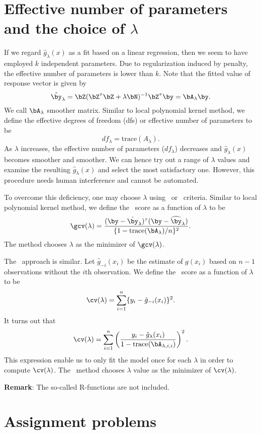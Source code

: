  
\section{Effective number of parameters and the choice of $\lambda$}
  
If we regard $\hat g_\lambda (x)$ as a fit based on
a linear regression, then we seem to have employed
$k$ independent parameters.
Due to regularization induced by penalty, the 
effective number of parameters is lower than $k$. 
Note that the fitted value of response vector is given by 
$$
\hat{\by}_{\lambda}
=\bZ (\bZ^\tau \bZ + \lambda \bN)^{-1}\bZ^\tau \by
=\bA_{\lambda} \by.
$$   
We call $\bA_{\lambda}$ smoother matrix.
Similar to local polynomial kernel method, we define
the effective degrees of  freedom (dfs) 
or effective number of parameters to be
$$
df_{\lambda} =\mbox{trace}(A_{\lambda}). 
$$ 
As $\lambda$ increases, the effective number of parameters 
($df_{\lambda}$) decreases and $ \hat g_{\lambda}(x)$ 
becomes smoother and smoother. 
We can hence  try out a range of $\lambda$ values and examine the resulting
$\hat g_\lambda (x)$ and select the most satisfactory one.
However, this procedure needs human interference and cannot
be automated.

To overcome this deficiency, one may choose $\lambda$ 
using \cv\ or \gcv\ criteria. 
Similar to local polynomial kernel method, we 
define the \gcv\ score as a function of $\lambda$ to be 
\[
\gcv (\lambda)
=
\frac{(\by-\hat\by_{\lambda})^\tau (\by-\widehat\by_{\lambda})}
{\{1-\mbox{trace} (\bA_{\lambda})/n\}^2}.
\]
The \gcv method chooses $\lambda$ as the minimizer of $\gcv(\lambda)$. 

The \cv\ approach is similar.
Let $\hat g_{-i}(x_i)$ be the estimate of $ g(x_i)$ 
based on $n-1$ observations without the $i$th observation. 
We define the \cv\ score as a function of $\lambda$ to be
\[
\cv(\lambda)
=
\sum_{i=1}^n\{y_i - \hat g_{-i}(x_i)\}^2. 
\]
It turns out that
$$
\cv (\lambda)
=\sum_{i=1}^n
\left(
\frac{y_i-\hat g_{\lambda} (x_i)}{1 - \mbox{trace}(\bA_{\lambda, i, i}) }
\right)^2.
$$
This expression enable us to only fit the model once for each $\lambda$
in order to compute $\cv(\lambda)$.
The \cv\ method chooses $\lambda$ value as the minimizer of $\cv(\lambda)$. 

\vs\vs
\noindent
{\bf Remark}: The so-called R-functions are not included.

\section{Assignment problems}

